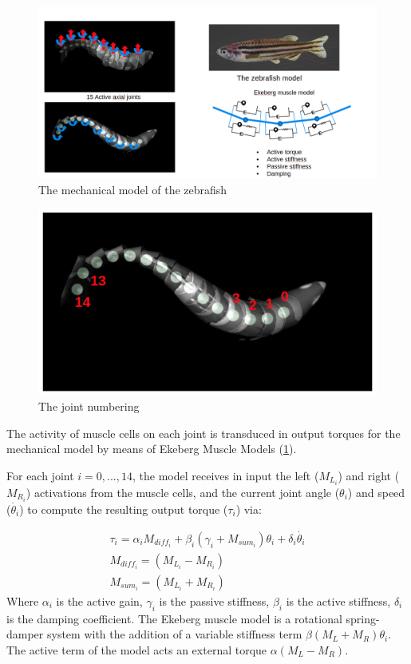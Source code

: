 \documentclass{cmc}
\begin{document}
\begin{figure}[ht]
  \centering \includegraphics[width=1.0\textwidth]{figures/mechanical.png}
  \caption{\label{fig:mechanical} The mechanical model of the zebrafish}
\end{figure}


\begin{figure}[ht]
  \centering \includegraphics[width=1.0\textwidth]{figures/joints.png}
  \caption{\label{fig:mechanical2} The joint numbering}
\end{figure}

The activity of muscle cells on each joint is transduced in output torques for
the mechanical model by means of Ekeberg Muscle Models (\ref{fig:mechanical}).

For each joint $i=0,...,14$, the model receives in input the left ($M_{L_i}$) and right ($M_{R_i}$)
activations from the muscle cells, and the current joint angle ($\theta_i$) and speed ($\Dot{\theta_i}$)
to compute the resulting output torque ($\tau_i$) via:

\begin{eqnarray}
\label{eq:electro_mechanical}
	\tau_i = \alpha_i M_{diff_i} + \beta_i(\gamma_i +M_{sum_i} )\theta_i + \delta_i \Dot{\theta_i} \\
    M_{diff_i} = (M_{L_i} - M_{R_i}) \\
    M_{sum_i} = (M_{L_i} + M_{R_i})
\end{eqnarray}
Where $\alpha_i$ is the active gain, $\gamma_i$ is the passive stiffness, $\beta_i$ is the active stiffness, $\delta_i$ is the damping coefficient. The Ekeberg muscle model is a rotational spring-damper system with the addition of a variable stiffness term $\beta (M_L+M_R) \theta_i$. The active term of the model acts an external torque $\alpha(M_L-M_R)$.
\end{document}
